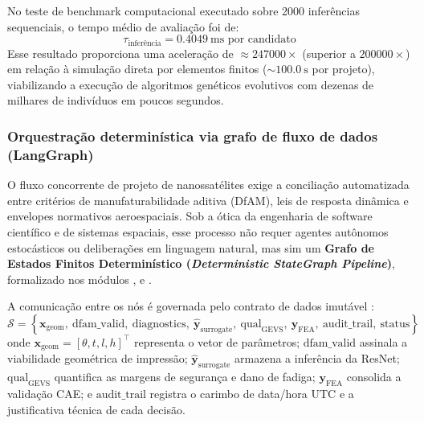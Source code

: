 No teste de benchmark computacional executado sobre \num{2000} inferências sequenciais, o tempo médio de avaliação foi de:
\begin{equation}
  \tau_{\text{inferência}} = \SI{0.4049}{\milli\second} \text{ por candidato}
  \label{eq:latencia}
\end{equation}
Esse resultado proporciona uma aceleração de $\approx \num{247000}\times$ (superior a $\num{200000}\times$) em relação à simulação direta por elementos finitos ($\sim \SI{100.0}{\second}$ por projeto), viabilizando a execução de algoritmos genéticos evolutivos com dezenas de milhares de indivíduos em poucos segundos.

\subsubsection{Orquestração determinística via grafo de fluxo de dados (LangGraph)}
\label{subsubsec:langgraph}

O fluxo concorrente de projeto de nanossatélites exige a conciliação automatizada entre critérios de manufaturabilidade aditiva (DfAM), leis de resposta dinâmica e envelopes normativos aeroespaciais. Sob a ótica da engenharia de software científico e de sistemas espaciais, esse processo não requer agentes autônomos estocásticos ou deliberações em linguagem natural, mas sim um \textbf{Grafo de Estados Finitos Determinístico (\textit{Deterministic StateGraph Pipeline})}, formalizado nos módulos ,  e .

A comunicação entre os nós é governada pelo contrato de dados imutável :
\begin{equation}
  \mathcal{S} = \left\{ \mathbf{x}_{\text{geom}},\ \text{dfam\_valid},\ \text{diagnostics},\ \hat{\mathbf{y}}_{\text{surrogate}},\ \text{qual}_{\text{GEVS}},\ \mathbf{y}_{\text{FEA}},\ \text{audit\_trail},\ \text{status} \right\}
  \label{eq:estado}
\end{equation}
onde $\mathbf{x}_{\text{geom}} = [\theta, t, l, h]^{\top}$ representa o vetor de parâmetros; $\text{dfam\_valid}$ assinala a viabilidade geométrica de impressão; $\hat{\mathbf{y}}_{\text{surrogate}}$ armazena a inferência da ResNet; $\text{qual}_{\text{GEVS}}$ quantifica as margens de segurança e dano de fadiga; $\mathbf{y}_{\text{FEA}}$ consolida a validação CAE; e $\text{audit\_trail}$ registra o carimbo de data/hora UTC e a justificativa técnica de cada decisão.


